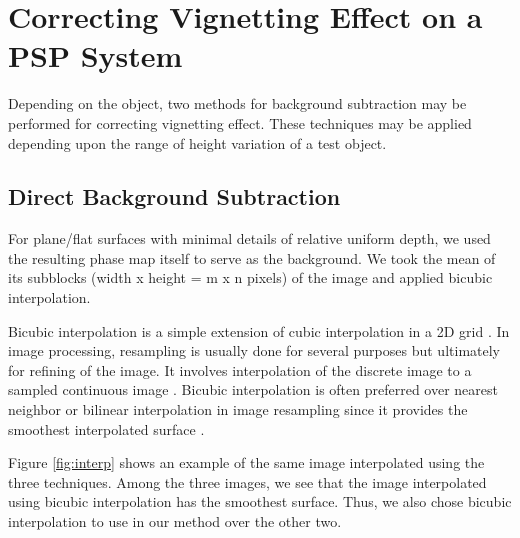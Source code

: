 \section{Correcting Vignetting Effect on a PSP System}

Depending on the object, two methods for background subtraction may be performed for correcting vignetting effect. These techniques may be applied depending upon the range of height variation of a test object. 

\subsection{Direct Background Subtraction}

For plane/flat surfaces with minimal details of relative uniform depth, we used the resulting phase map itself to serve as the background. 
We took the mean of its subblocks (width x height = m x n pixels) of the image and applied bicubic interpolation.

Bicubic interpolation is a simple extension of cubic interpolation in a 2D grid \cite{Keys1981}. 
In image processing, resampling is usually done for several purposes but ultimately for refining of the image. It involves interpolation of the discrete image to a sampled continuous image \cite{Parker1983}. Bicubic interpolation is often preferred over nearest neighbor or bilinear interpolation in image resampling since it provides the smoothest interpolated surface \cite{Keys1981}. 

Figure \ref{fig:interp} shows an example of the same image interpolated using the three techniques. 
Among the three images, we see that the image interpolated using bicubic interpolation has the smoothest surface. 
Thus, we also chose bicubic interpolation to use in our method over the other two.

